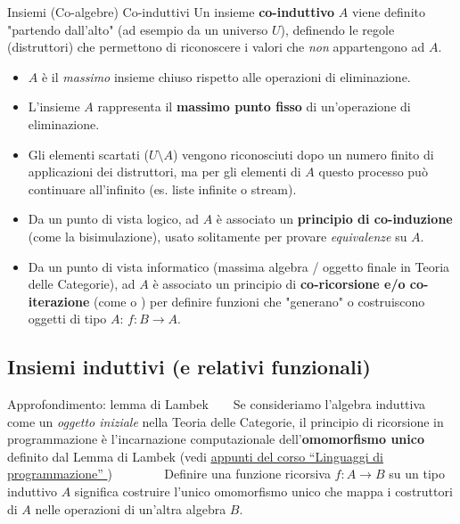 \begin{defframe}{Insiemi (Co-algebre) Co-induttivi}{}
    Un insieme \textbf{co-induttivo} $A$ viene definito "partendo dall'alto" (ad esempio da un universo $U$), definendo le regole (distruttori) che permettono di riconoscere i valori che \textit{non} appartengono ad $A$.
    
    \begin{itemize}
        \item $A$ è il \textit{massimo} insieme chiuso rispetto alle operazioni di eliminazione. 
        \item L'insieme $A$ rappresenta il \textbf{massimo punto fisso} di un'operazione di eliminazione.
        \item Gli elementi scartati ($U \setminus A$) vengono riconosciuti dopo un numero finito di applicazioni dei distruttori, ma per gli elementi di $A$ questo processo può continuare all'infinito (es. liste infinite o stream).
            \item Da un punto di vista logico, ad $A$ è associato un \textbf{principio di co-induzione} (come la bisimulazione), usato solitamente per provare \textit{equivalenze} su $A$.
            \item Da un punto di vista informatico (massima algebra / oggetto finale in Teoria delle Categorie), ad $A$ è associato un principio di \textbf{co-ricorsione e/o co-iterazione} (come  o ) per definire funzioni che "generano" o costruiscono oggetti di tipo $A$: $f \colon B \to A$.
    \end{itemize}
\end{defframe}

\subsection{Insiemi induttivi (e relativi funzionali)}
\begin{gframe}{Approfondimento: lemma di Lambek}
        Se consideriamo l'algebra induttiva come un \textit{oggetto iniziale} nella Teoria delle Categorie, il principio di ricorsione in programmazione è l'incarnazione computazionale dell'\textbf{omomorfismo unico} definito dal Lemma di Lambek (vedi \href{https://raw.githubusercontent.com/AglaiaNorza/notes-ig/main/terzo%20anno/linguaggi%20di%20programmazione.pdf}{\underline{appunti del corso ``Linguaggi di programmazione''} })
    
    Definire una funzione ricorsiva $f \colon A \to B$ su un tipo induttivo $A$ significa costruire l'unico omomorfismo unico che mappa i costruttori di $A$ nelle operazioni di un'altra algebra $B$.
\end{gframe}

